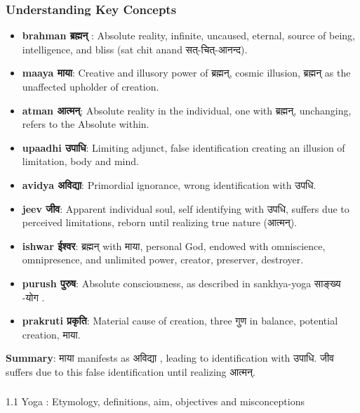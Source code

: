 \begin{frame}[fragile]\frametitle{Understanding Key Concepts}
      \begin{itemize}
        \item \textbf{brahman ब्रह्मन् }: Absolute reality, infinite, uncaused, eternal, source of being, intelligence, and bliss (sat chit anand सत्-चित्-आनन्द).
        \item \textbf{maaya माया}: Creative and illusory power of ब्रह्मन्, cosmic illusion, ब्रह्मन् as the unaffected upholder of creation.
        \item \textbf{atman आत्मन्}: Absolute reality in the individual, one with ब्रह्मन्, unchanging, refers to the Absolute within.
        \item \textbf{upaadhi उपाधि}: Limiting adjunct, false identification creating an illusion of limitation, body and mind.
        \item \textbf{avidya अविद्या}: Primordial ignorance, wrong identification with उपधि.
        \item \textbf{jeev जीव}: Apparent individual soul, self identifying with उपधि, suffers due to perceived limitations, reborn until realizing true nature (आत्मन्).
        \item \textbf{ishwar ईश्वर}: ब्रह्मन् with माया, personal God, endowed with omniscience, omnipresence, and unlimited power, creator, preserver, destroyer.
        \item \textbf{purush पुरुष}: Absolute consciousness, as described in sankhya-yoga साङ्ख्य -योग .
        \item \textbf{prakruti प्रकृति}: Material cause of creation, three गुण  in balance, potential creation, माया.
      \end{itemize}
	  
\textbf{Summary}: माया manifests as अविद्या , leading to identification with उपाधि. जीव suffers due to this false identification until realizing आत्मन्.	  
\end{frame}



\begin{frame}[fragile]\frametitle{}
\begin{center}
{\Large 1.1 Yoga : Etymology, definitions, aim, objectives and misconceptions}
\end{center}
\end{frame}


